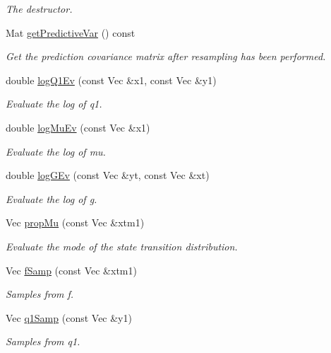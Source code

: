 \begin{DoxyCompactItemize}
\begin{DoxyCompactList}\small\item\em The destructor. \end{DoxyCompactList}\item 
Mat \hyperlink{classJacEtAlAPF_a568748b544f75aad1cf779216affc229}{get\+Predictive\+Var} () const 
\begin{DoxyCompactList}\small\item\em Get the prediction covariance matrix after resampling has been performed. \end{DoxyCompactList}\item 
double \hyperlink{classJacEtAlAPF_a36e56af90cafe323fc42d8eaf75402f9}{log\+Q1\+Ev} (const Vec \&x1, const Vec \&y1)
\begin{DoxyCompactList}\small\item\em Evaluate the log of q1. \end{DoxyCompactList}\item 
double \hyperlink{classJacEtAlAPF_ac61d6bcb7a63bc95fda6e138255c2535}{log\+Mu\+Ev} (const Vec \&x1)
\begin{DoxyCompactList}\small\item\em Evaluate the log of mu. \end{DoxyCompactList}\item 
double \hyperlink{classJacEtAlAPF_a0cd22a37063906eddf47f8b4887919eb}{log\+G\+Ev} (const Vec \&yt, const Vec \&xt)
\begin{DoxyCompactList}\small\item\em Evaluate the log of g. \end{DoxyCompactList}\item 
Vec \hyperlink{classJacEtAlAPF_a3066fe2bd0b399a85eaf51ecdb1c3660}{prop\+Mu} (const Vec \&xtm1)
\begin{DoxyCompactList}\small\item\em Evaluate the mode of the state transition distribution. \end{DoxyCompactList}\item 
Vec \hyperlink{classJacEtAlAPF_abb98b3c8dcb28b43bebf54c15e0f8616}{f\+Samp} (const Vec \&xtm1)
\begin{DoxyCompactList}\small\item\em Samples from f. \end{DoxyCompactList}\item 
Vec \hyperlink{classJacEtAlAPF_afdd084c634e7ad591499a6c8c90ee9d0}{q1\+Samp} (const Vec \&y1)
\begin{DoxyCompactList}\small\item\em Samples from q1. \end{DoxyCompactList}\end{DoxyCompactItemize}


